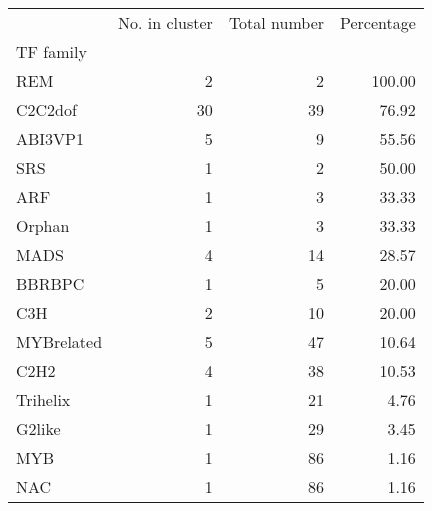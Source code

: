 \begin{tabular}{lrrr}
\toprule
{} &  No. in cluster &  Total number &  Percentage \\
TF family  &                 &               &             \\
\midrule
REM        &               2 &             2 &      100.00 \\
C2C2dof    &              30 &            39 &       76.92 \\
ABI3VP1    &               5 &             9 &       55.56 \\
SRS        &               1 &             2 &       50.00 \\
ARF        &               1 &             3 &       33.33 \\
Orphan     &               1 &             3 &       33.33 \\
MADS       &               4 &            14 &       28.57 \\
BBRBPC     &               1 &             5 &       20.00 \\
C3H        &               2 &            10 &       20.00 \\
MYBrelated &               5 &            47 &       10.64 \\
C2H2       &               4 &            38 &       10.53 \\
Trihelix   &               1 &            21 &        4.76 \\
G2like     &               1 &            29 &        3.45 \\
MYB        &               1 &            86 &        1.16 \\
NAC        &               1 &            86 &        1.16 \\
\bottomrule
\end{tabular}
